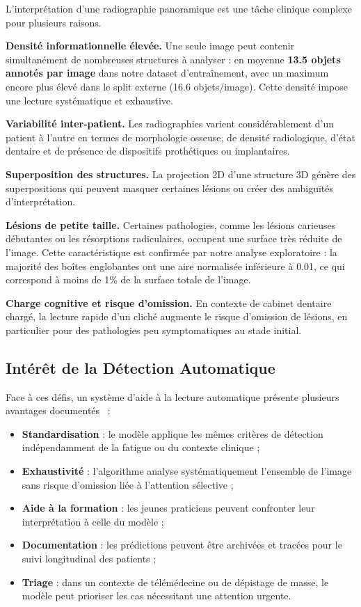 \documentclass{rapportENSIAS}
\begin{document}
L'interprétation d'une radiographie panoramique est une tâche clinique complexe pour plusieurs raisons.

\textbf{Densité informationnelle élevée.} Une seule image peut contenir simultanément de nombreuses structures à analyser : en moyenne \textbf{13.5 objets annotés par image} dans notre dataset d'entraînement, avec un maximum encore plus élevé dans le split externe (16.6 objets/image). Cette densité impose une lecture systématique et exhaustive.

\textbf{Variabilité inter-patient.} Les radiographies varient considérablement d'un patient à l'autre en termes de morphologie osseuse, de densité radiologique, d'état dentaire et de présence de dispositifs prothétiques ou implantaires.

\textbf{Superposition des structures.} La projection 2D d'une structure 3D génère des superpositions qui peuvent masquer certaines lésions ou créer des ambiguïtés d'interprétation.

\textbf{Lésions de petite taille.} Certaines pathologies, comme les lésions carieuses débutantes ou les résorptions radiculaires, occupent une surface très réduite de l'image. Cette caractéristique est confirmée par notre analyse exploratoire : la majorité des boîtes englobantes ont une aire normalisée inférieure à 0.01, ce qui correspond à moins de 1\% de la surface totale de l'image.

\textbf{Charge cognitive et risque d'omission.} En contexte de cabinet dentaire chargé, la lecture rapide d'un cliché augmente le risque d'omission de lésions, en particulier pour des pathologies peu symptomatiques au stade initial.

\subsection{Intérêt de la Détection Automatique}

Face à ces défis, un système d'aide à la lecture automatique présente plusieurs avantages documentés~\cite{schwendicke2019deep} :

\begin{itemize}
    \item \textbf{Standardisation} : le modèle applique les mêmes critères de détection indépendamment de la fatigue ou du contexte clinique ;
    \item \textbf{Exhaustivité} : l'algorithme analyse systématiquement l'ensemble de l'image sans risque d'omission liée à l'attention sélective ;
    \item \textbf{Aide à la formation} : les jeunes praticiens peuvent confronter leur interprétation à celle du modèle ;
    \item \textbf{Documentation} : les prédictions peuvent être archivées et tracées pour le suivi longitudinal des patients ;
    \item \textbf{Triage} : dans un contexte de télémédecine ou de dépistage de masse, le modèle peut prioriser les cas nécessitant une attention urgente.
\end{itemize}
\end{document}
